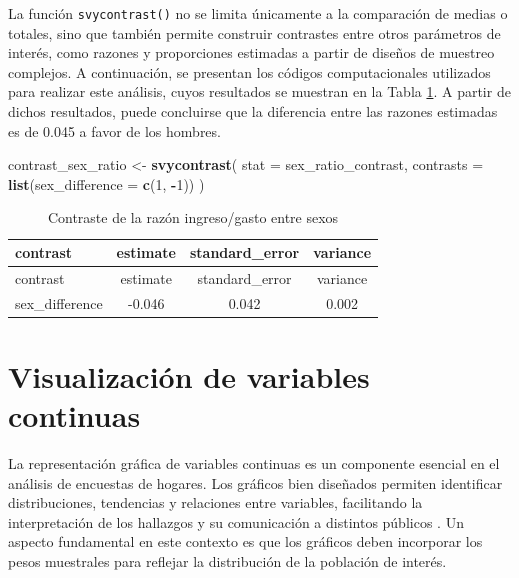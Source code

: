 \documentclass[
  spanish,
  12pt,
]{book}
\newenvironment{Shaded}{\begin{snugshade}}{\end{snugshade}}
\newcommand{\AttributeTok}[1]{\textcolor[rgb]{0.13,0.29,0.53}{#1}}
\newcommand{\DecValTok}[1]{\textcolor[rgb]{0.00,0.00,0.81}{#1}}
\newcommand{\FunctionTok}[1]{\textcolor[rgb]{0.13,0.29,0.53}{\textbf{#1}}}
\newcommand{\NormalTok}[1]{#1}
\newcommand{\OtherTok}[1]{\textcolor[rgb]{0.56,0.35,0.01}{#1}}
\newcommand{\SpecialCharTok}[1]{\textcolor[rgb]{0.81,0.36,0.00}{\textbf{#1}}}
\begin{document}
La función \texttt{svycontrast()} no se limita únicamente a la comparación de medias o totales, sino que también permite construir contrastes entre otros parámetros de interés, como razones y proporciones estimadas a partir de diseños de muestreo complejos. A continuación, se presentan los códigos computacionales utilizados para realizar este análisis, cuyos resultados se muestran en la Tabla \ref{tab:tab-contraste-razon-sexo}. A partir de dichos resultados, puede concluirse que la diferencia entre las razones estimadas es de 0.045 a favor de los hombres.

\begin{Shaded}
\begin{Highlighting}[]
\NormalTok{contrast\_sex\_ratio }\OtherTok{\textless{}{-}} \FunctionTok{svycontrast}\NormalTok{(}
  \AttributeTok{stat =}\NormalTok{ sex\_ratio\_contrast,}
  \AttributeTok{contrasts =} \FunctionTok{list}\NormalTok{(}\AttributeTok{sex\_difference =} \FunctionTok{c}\NormalTok{(}\DecValTok{1}\NormalTok{, }\SpecialCharTok{{-}}\DecValTok{1}\NormalTok{))}
\NormalTok{)}
\end{Highlighting}
\end{Shaded}

\begin{longtable}[]{@{}lccc@{}}
\caption{\label{tab:tab-contraste-razon-sexo}Contraste de la razón ingreso/gasto entre sexos}\tabularnewline
\toprule\noalign{}
contrast & estimate & standard\_error & variance \\
\midrule\noalign{}
\endfirsthead
\toprule\noalign{}
contrast & estimate & standard\_error & variance \\
\midrule\noalign{}
\endhead
\bottomrule\noalign{}
\endlastfoot
sex\_difference & -0.046 & 0.042 & 0.002 \\
\end{longtable}

\section{Visualización de variables continuas}\label{viz-continuas}

La representación gráfica de variables continuas es un componente esencial en el análisis de encuestas de hogares. Los gráficos bien diseñados permiten identificar distribuciones, tendencias y relaciones entre variables, facilitando la interpretación de los hallazgos y su comunicación a distintos públicos \citep{wilkinson2005grammar}. Un aspecto fundamental en este contexto es que los gráficos deben incorporar los pesos muestrales para reflejar la distribución de la población de interés.
\end{document}
